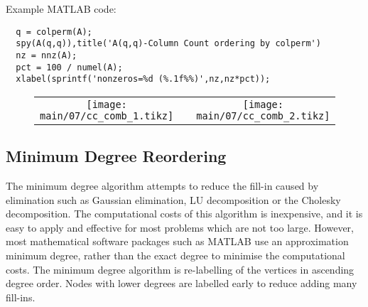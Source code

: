   Example MATLAB code:
  \begin{lstlisting}
  q = colperm(A);
  spy(A(q,q)),title('A(q,q)-Column Count ordering by colperm')
  nz = nnz(A);
  pct = 100 / numel(A);
  xlabel(sprintf('nonzeros=%d (%.1f%%)',nz,nz*pct));
  \end{lstlisting}
  \begin{figure}[H]
    \begin{center}
      \scriptsize
      \begin{tabular}{ccc}
        \texttt{[image: main/07/cc\_comb\_1.tikz]}
        &&
        \texttt{[image: main/07/cc\_comb\_2.tikz]}
      \end{tabular}
    \end{center}
  \end{figure}
  
  \subsection{Minimum Degree Reordering}
  The minimum degree algorithm attempts to reduce the fill-in caused by
  elimination such as Gaussian elimination, LU decomposition or the Cholesky
  decomposition. The computational costs of this algorithm is inexpensive, and it
  is easy to apply and effective for most problems which are not too large.
  However, most mathematical software packages such as MATLAB use an approximation
  minimum degree, rather than the exact degree to minimise the computational costs.
  The minimum degree algorithm is re-labelling of the vertices in ascending degree
  order. Nodes with lower degrees are labelled early to reduce adding many
  fill-ins.
  
